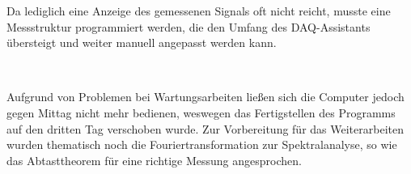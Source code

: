 Da lediglich eine Anzeige des gemessenen Signals oft nicht reicht, musste eine Messstruktur programmiert werden, die den Umfang des DAQ-Assistants übersteigt und weiter manuell angepasst werden kann.
	
\

Aufgrund von Problemen bei Wartungsarbeiten ließen sich die Computer jedoch gegen Mittag nicht mehr bedienen, weswegen das Fertigstellen des Programms auf den dritten Tag verschoben wurde. 
Zur Vorbereitung für das Weiterarbeiten wurden thematisch noch die Fouriertransformation zur Spektralanalyse, so wie das Abtasttheorem für eine richtige Messung angesprochen.
	
\

